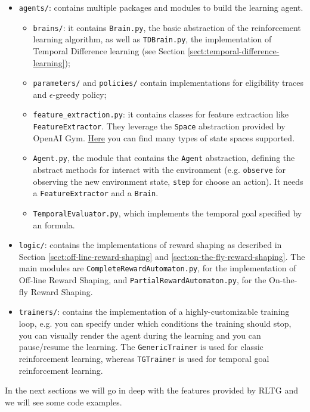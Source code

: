 \begin{itemize}
	\item \texttt{agents/}: contains multiple packages and modules to build the learning agent.
	\begin{itemize}
		\item \texttt{brains/}: it contains \texttt{Brain.py}, the basic abstraction of the reinforcement learning algorithm, as well as \texttt{TDBrain.py}, the implementation of Temporal Difference learning (see Section \ref{sect:temporal-difference-learning});
		\item \texttt{parameters/} and \texttt{policies/} contain implementations for eligibility traces and $\epsilon$-greedy policy;
		\item \texttt{feature\_extraction.py}: it contains classes for feature extraction like \texttt{FeatureExtractor}. They leverage the \texttt{Space} abstraction provided by OpenAI Gym. \href{https://github.com/openai/gym/tree/master/gym/spaces}{Here} you can find many types of state spaces supported.
		\item \texttt{Agent.py}, the module that contains the \texttt{Agent} abstraction, defining the abstract methods for interact with the environment (e.g. \texttt{observe} for observing the new environment state, \texttt{step} for choose an action). It needs a \texttt{FeatureExtractor} and a \texttt{Brain}.
		\item \texttt{TemporalEvaluator.py}, which implements the temporal goal specified by an \LLf formula.
	\end{itemize}
	\item \texttt{logic/}: contains the implementations of reward shaping as described in Section \ref{sect:off-line-reward-shaping} and \ref{sect:on-the-fly-reward-shaping}. The main modules are \texttt{CompleteRewardAutomaton.py}, for the implementation of Off-line Reward Shaping, and \texttt{PartialRewardAutomaton.py}, for the On-the-fly Reward Shaping.
	\item \texttt{trainers/}: contains the implementation of a highly-customizable training loop, e.g. you can specify under which conditions the training should stop, you can visually render the agent during the learning and you can pause/resume the learning. The \texttt{GenericTrainer} is used for classic reinforcement learning, whereas \texttt{TGTrainer} is used for temporal goal reinforcement learning.
\end{itemize}

In the next sections we will go in deep with the features provided by RLTG and we will see some code examples.


